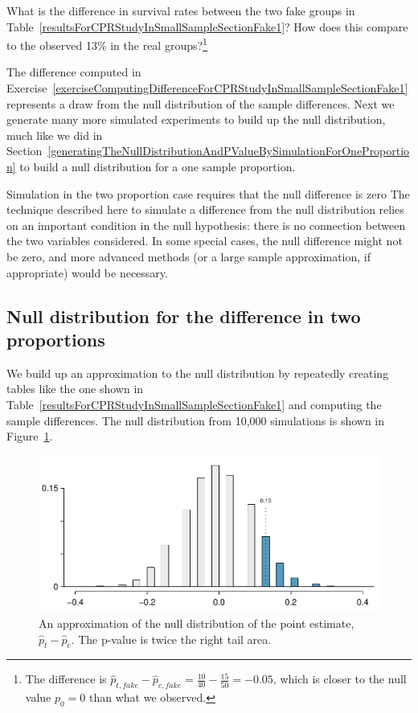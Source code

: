 \begin{exercise} \label{exerciseComputingDifferenceForCPRStudyInSmallSampleSectionFake1}
What is the difference in survival rates between the two fake groups in Table~\ref{resultsForCPRStudyInSmallSampleSectionFake1}? How does this compare to the observed 13\% in the real groups?\footnote{The difference is $\hat{p}_{t, fake} - \hat{p}_{c, fake} = \frac{10}{40} - \frac{15}{50} = -0.05$, which is closer to the null value $p_0=0$ than what we observed.}
\end{exercise}

The difference computed in Exercise~\ref{exerciseComputingDifferenceForCPRStudyInSmallSampleSectionFake1} represents a draw from the null distribution of the sample differences. Next we generate many more simulated experiments to build up the null distribution, much like we did in Section~\ref{generatingTheNullDistributionAndPValueBySimulationForOneProportion} to build a null distribution for a one sample proportion.

\begin{caution}{Simulation in the two proportion case requires that the null difference is zero}
{The technique described here to simulate a difference from the null distribution relies on an important condition in the null hypothesis: there is no connection between the two variables considered. In some special cases, the null difference might not be zero, and more advanced methods (or a large sample approximation, if appropriate) would be necessary.}
\end{caution}

\subsection{Null distribution for the difference in two proportions}

We build up an approximation to the null distribution by repeatedly creating tables like the one shown in Table~\ref{resultsForCPRStudyInSmallSampleSectionFake1} and computing the sample differences. The null distribution from 10,000 simulations is shown in Figure~\ref{pValueCPRStudySmallSampleAnalysisInSmallSampleSection}.
\begin{figure}
\centering
\includegraphics[width=\textwidth]{ch_inference_for_props/figures/pValueCPRStudySmallSampleAnalysisInSmallSampleSection/pValueCPRStudySmallSampleAnalysisInSmallSampleSection}
\caption{An approximation of the null distribution of the point estimate, $\hat{p}_t - \hat{p}_c$. The p-value is twice the right tail area.}
\label{pValueCPRStudySmallSampleAnalysisInSmallSampleSection}
\end{figure}

